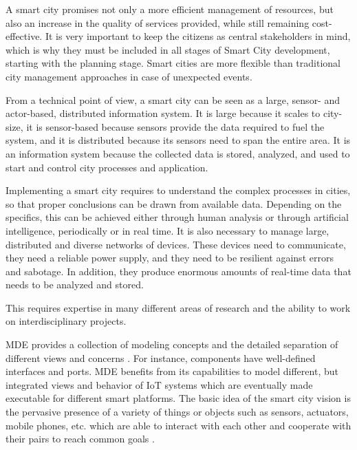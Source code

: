 A smart city promises not only a more efficient management of resources, but also an increase in the quality of services provided, while still remaining cost-effective. It is very important to keep the citizens as central stakeholders in mind, which is why they must be included in all stages of Smart City development, starting with the planning stage. Smart cities are more flexible than traditional city management approaches in case of unexpected events.

From a technical point of view, a smart city can be seen as a large, sensor- and actor-based, distributed information system. It is large because it scales to city-size, it is sensor-based because sensors provide the data required to fuel the system, and it is distributed because its sensors need to span the entire area. It is an information system because the collected data is stored, analyzed, and used to start and control city processes and application.

Implementing a smart city requires to understand the complex processes in cities, so that proper conclusions can be drawn from available data. Depending on the specifics, this can be achieved either through human analysis or through artificial intelligence, periodically or in real time. It is also necessary to manage large, distributed and diverse networks of devices. These devices need to communicate, they need a reliable power supply, and they need to be resilient against errors and sabotage. In addition, they produce enormous amounts of real-time data that needs to be analyzed and stored.

This requires expertise in many different areas of research and the ability to work on interdisciplinary projects.


MDE provides a collection of modeling concepts and the detailed separation of different views and concerns \cite{KateuleWinter2018}. For instance, components have well-defined interfaces and ports. MDE benefits from its capabilities to model different, but integrated views and behavior of IoT systems which are eventually made executable for different smart platforms. The basic idea of the smart city vision is the pervasive presence of a variety of things or objects such as sensors, actuators, mobile phones, etc. which are able to interact with each other and cooperate with their pairs to reach common goals \cite{Atzori+2010} \cite{WeberRomana2010}.